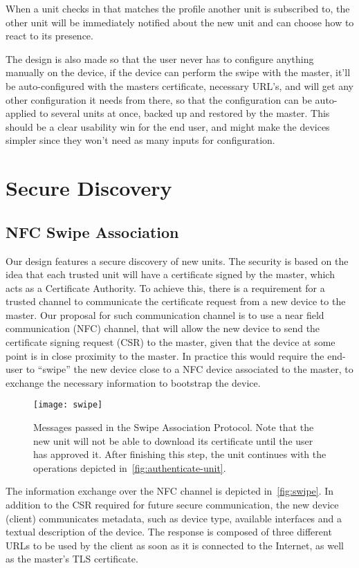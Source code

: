 When a unit checks in that matches the profile another unit is subscribed to, the other unit will be immediately notified about the new unit and can choose how to react to its presence.

The design is also made so that the user never has to configure anything manually on the device, if the device can perform the swipe with the master, it'll be auto-configured with the masters certificate, necessary URL’s, and will get any other configuration it needs from there, so that the configuration can be auto-applied to several units at once, backed up and restored by the master. This should be a clear usability win for the end user, and might make the devices simpler since they won't need as many inputs for configuration.


\section{Secure Discovery}
\subsection{NFC Swipe Association}
Our design features a secure discovery of new units. The security is based on the idea that each trusted unit will have a certificate signed by the master, which acts as a Certificate Authority. To achieve this, there is a requirement for a trusted channel to communicate the certificate request from a new device to the master. Our proposal for such communication channel is to use a near field communication (NFC) channel, that will allow the new device to send the certificate signing request (CSR) to the master, given that the device at some point is in close proximity to the master. In practice this would require the end-user to “swipe” the new device close to a NFC device associated to the master, to exchange the necessary information to bootstrap the device.

\begin{figure}[ht]
    \centering
    \texttt{[image: swipe]}
    \caption{Messages passed in the Swipe Association Protocol. Note that the new unit will not be able to download its certificate until the user has approved it. After finishing this step, the unit continues with the operations depicted in~\autoref{fig:authenticate-unit}.}
    \label{fig:swipe}
\end{figure}

The information exchange over the NFC channel is depicted in~\autoref{fig:swipe}. In addition to the CSR required for future secure communication, the new device (client) communicates metadata, such as device type, available interfaces and a textual description of the device. The response is composed of three different URLs to be used by the client as soon as it is connected to the Internet, as well as the master's TLS certificate.

